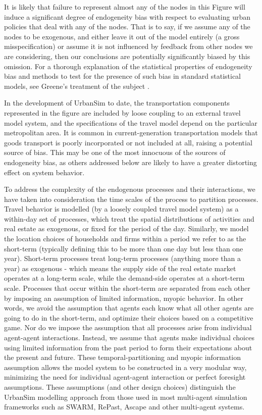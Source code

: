 \documentclass[12pt,a4paper]{article}
\begin{document}
It is likely that failure to represent almost any of the nodes in
this Figure will induce a significant degree of endogeneity bias
with respect to evaluating urban policies that deal with any of
the nodes.  That is to say, if we assume any of the nodes to be
exogenous, and either leave it out of the model entirely (a gross
misspecification) or assume it is not influenced by feedback from
other nodes we are considering, then our conclusions are
potentially significantly biased by this omission. For a thorough
explanation of the statistical properties of endogeneity bias and
methods to test for the presence of such bias in standard
statistical models, see Greene's treatment of the subject
\cite{greene-2002}.

In the development of UrbanSim to date, the transportation
components represented in the figure are included by loose
coupling to an external travel model system, and the
specifications of the travel model depend on the particular
metropolitan area.  It is common in current-generation
transportation models that goods transport is poorly incorporated
or not included at all, raising a potential source of bias.  This
may be one of the most innocuous of the sources of endogeneity
bias, as others addressed below are likely to have a greater
distorting effect on system behavior.

To address the complexity of the endogenous processes and their
interactions, we have taken into consideration the time scales of
the process to partition processes.  Travel behavior is modelled
(by a loosely coupled travel model system) as a within-day set of
processes, which treat the spatial distributions of activities and
real estate as exogenous, or fixed for the period of the day.
Similarly, we model the location choices of households and firms
within a period we refer to as the short-term (typically defining
this to be more than one day but less than one year).  Short-term
processes treat long-term processes (anything more than a year) as
exogenous - which means the supply side of the real estate market
operates at a long-term scale, while the demand-side operates at a
short-term scale.  Processes that occur within the short-term are
separated from each other by imposing an assumption of limited
information, myopic behavior.  In other words, we avoid the
assumption that agents each know what all other agents are going
to do in the short-term, and optimize their choices based on a
competitive game.  Nor do we impose the assumption that all
processes arise from individual agent-agent interactions. Instead,
we assume that agents make individual choices using limited
information from the past period to form their expectations about
the present and future. These temporal-partitioning and myopic
information assumption allows the model system to be constructed
in a very modular way, minimizing the need for individual
agent-agent interaction or perfect foresight assumptions. These
assumptions (and other design choices) distinguish the UrbanSim
modelling approach from those used in most multi-agent simulation
frameworks such as SWARM, RePast, Ascape and other multi-agent
systems.
\end{document}
